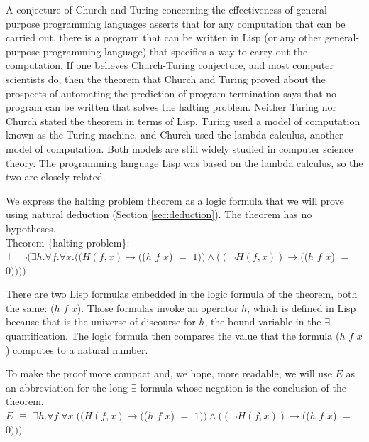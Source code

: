 \label{church-turing-hypothesis}A
conjecture of Church and Turing
concerning the effectiveness of general-purpose programming languages
asserts that for any computation that can be carried out, there is a program
that can be written in Lisp (or any other general-purpose programming language)
that specifies a way to carry out the computation.
If one believes Church-Turing conjecture, and most computer scientists do,
then the theorem that Church and Turing proved about the prospects of
automating the prediction of program termination
says that no program can be written that solves the halting problem.
Neither Turing nor Church stated the theorem in terms of Lisp.
Turing used a model of computation known as the Turing machine, and
Church used the lambda calculus, another model of computation.
Both models are still widely studied in computer science theory.
The programming language Lisp
was based on the lambda calculus, so the two are closely related.

We express the halting problem
theorem as a logic formula that we will prove
using natural deduction (Section \ref{sec:deduction}).
The theorem has no hypotheses.
\vspace{2mm}\\
\hspace*{5mm}Theorem \{halting problem\}:\\
\hspace*{1cm}$\vdash$ $\neg(\exists h. \forall f. \forall x.
((H(f, x) \rightarrow ($\textsf{($h$ $f$ $x$)} $=$ $1)) \wedge ((\neg H(f, x)) \rightarrow ($\textsf{($h$ $f$ $x$)} $=$ $0))))$
\vspace{2mm}

There are two Lisp formulas embedded in
the logic formula of the theorem, both the same:
\textsf{($h$ $f$ $x$)}.
Those formulas invoke an operator $h$, which is defined in Lisp because that is the universe
of discourse for $h$, the bound variable in the $\exists$ quantification.
The logic formula then compares the value that
the formula \textsf{($h$ $f$ $x$)} computes to a natural number.

To make the proof more compact and, we hope, more readable,
we will use $E$ as an abbreviation for the
long $\exists$ formula whose negation is the conclusion of the theorem.
\vspace{2mm}\\
\hspace*{5mm}$E$ $\equiv$ $\exists h. \forall f. \forall x.
((H(f, x) \rightarrow ($\textsf{($h$ $f$ $x$)} $=$ $1)) \wedge ((\neg H(f, x)) \rightarrow ($\textsf{($h$ $f$ $x$)} $=$ $0)))$
\vspace{2mm}

